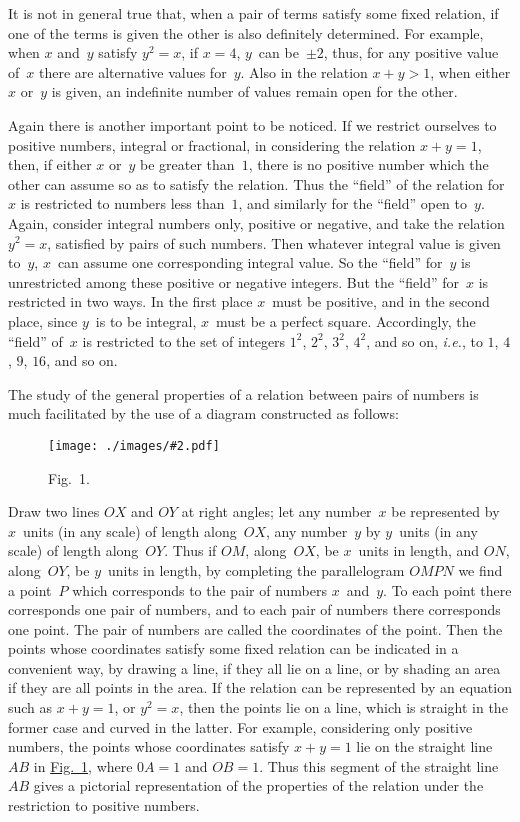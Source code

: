\documentclass[12pt,leqno]{book}[2005/09/16]
\newcommand{\Graphic}[2]{%
  \phantomsection\label{fig:#2}%
  \texttt{[image: ./images/\#2.pdf]}%
}
\newcommand{\DefWidth}{4in}%
\newcommand{\Figure}[2][\DefWidth]{%
  \begin{figure}[hbt!]
    \centering
    \phantomsection\label{fig:#2}
    \Graphic{#1}{fig#2}
    \caption{Fig.~#2.}
  \end{figure}\ignorespaces%
}
\newcommand{\Fig}[2][Fig.]{\hyperref[fig:#2]{#1~#2}}
\newcommand{\PageSep}[1]{\ignorespaces}
\newcommand{\ie}{\emph{i.e.}}
\begin{document}
It is not in general true that, when a pair
of terms satisfy some fixed relation, if one of
the terms is given the other is also definitely
determined. For example, when $x$ and~$y$
satisfy $y^{2} = x$, if $x = 4$, $y$~can be~$±2$, thus,
for any positive value of~$x$ there are alternative
values for~$y$. Also in the relation
$x + y > 1$, when either $x$ or~$y$ is given, an
indefinite number of values remain open for
the other.

Again there is another important point to
be noticed. If we restrict ourselves to positive
numbers, integral or fractional, in considering
the relation $x + y = 1$, then, if either
$x$ or~$y$ be greater than~$1$, there is no positive
number which the other can assume so as to
satisfy the relation. Thus the ``field'' of
the relation for~$x$ is restricted to numbers less
than~$1$, and similarly for the ``field'' open
to~$y$. Again, consider integral numbers only,
positive or negative, and take the relation
\PageSep{20}
$y^{2} = x$, satisfied by pairs of such numbers.
Then whatever integral value is given to~$y$,
$x$~can assume one corresponding integral
value. So the ``field'' for~$y$ is unrestricted
among these positive or negative integers.
But the ``field'' for~$x$ is restricted in two
ways. In the first place $x$~must be positive,
and in the second place, since $y$~is to be integral,
$x$~must be a perfect square. Accordingly,
the ``field'' of~$x$ is restricted to the set
of integers $1^{2}$, $2^{2}$, $3^{2}$, $4^{2}$, and so on, \ie, to $1$,
$4$, $9$, $16$, and so on.

The study of the general properties of a
relation between pairs of numbers is much
facilitated by the use of a diagram constructed
as follows:
\Figure[3.5in]{1}

Draw two lines $OX$ and $OY$ at right angles;
let any number~$x$ be represented by $x$~units
\PageSep{21}
(in any scale) of length along~$OX$, any number~$y$
by $y$~units (in any scale) of length along~$OY$.
Thus if $OM$, along~$OX$, be $x$~units in
length, and $ON$, along~$OY$, be $y$~units in length,
by completing the parallelogram $OMPN$ we
find a point~$P$ which corresponds to the pair
of numbers $x$~and~$y$. To each point there
corresponds one pair of numbers, and to each
pair of numbers there corresponds one point.
The pair of numbers are called the coordinates
of the point. Then the points
whose coordinates satisfy some fixed relation
can be indicated in a convenient way,
by drawing a line, if they all lie on a line,
or by shading an area if they are all points
in the area. If the relation can be represented
by an equation such as $x + y = 1$, or
$y^{2} = x$, then the points lie on a line, which is
straight in the former case and curved in
the latter. For example, considering only
positive numbers, the points whose coordinates
satisfy $x + y = 1$ lie on the straight
line~$AB$ in \Fig{1}, where $0A = 1$ and $OB = 1$.
Thus this segment of the straight line~$AB$
gives a pictorial representation of the properties
of the relation under the restriction to
positive numbers.
\end{document}
